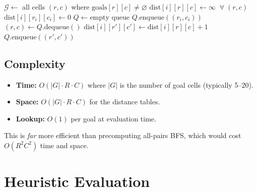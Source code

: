 \documentclass[11pt, a4paper]{article}
\begin{document}
\begin{algorithm}[H]
\caption{Preprocessing: BFS from Goal Cells}
\begin{algorithmic}[1]
    \State $\mathcal{G} \gets$ all cells $(r,c)$ where $\text{goals}[r][c] \neq \varnothing$
        \State $\text{dist}[i][r][c] \gets \infty \;\;\forall\; (r,c)$
        \State $\text{dist}[i][r_i][c_i] \gets 0$
        \State $Q \gets \text{empty queue}$
        \State $Q.\text{enqueue}((r_i, c_i))$
            \State $(r, c) \gets Q.\text{dequeue}()$
                    \State $\text{dist}[i][r'][c'] \gets \text{dist}[i][r][c] + 1$
                    \State $Q.\text{enqueue}((r', c'))$
                \EndIf
            \EndFor
        \EndWhile
    \EndFor
\EndProcedure
\end{algorithmic}
\end{algorithm}

\subsection{Complexity}

\begin{itemize}
    \item \textbf{Time:} $O(|G| \cdot R \cdot C)$ where $|G|$ is the number of goal cells (typically 5--20).
    \item \textbf{Space:} $O(|G| \cdot R \cdot C)$ for the distance tables.
    \item \textbf{Lookup:} $O(1)$ per goal at evaluation time.
\end{itemize}

This is \emph{far} more efficient than precomputing all-pairs BFS, which would cost $O(R^2 C^2)$ time and space.

\section{Heuristic Evaluation}
\end{document}

